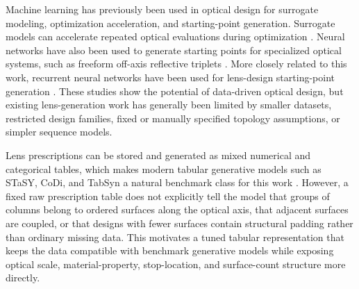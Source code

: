 Machine learning has previously been used in optical design for surrogate modeling, optimization acceleration, and starting-point generation. Surrogate models can accelerate repeated optical evaluations during optimization \cite{hegde2019accelerating}. Neural networks have also been used to generate starting points for specialized optical systems, such as freeform off-axis reflective triplets \cite{Yang:19}. More closely related to this work, recurrent neural networks have been used for lens-design starting-point generation \cite{Cote:21}. These studies show the potential of data-driven optical design, but existing lens-generation work has generally been limited by smaller datasets, restricted design families, fixed or manually specified topology assumptions, or simpler sequence models.

Lens prescriptions can be stored and generated as mixed numerical and categorical tables, which makes modern tabular generative models such as STaSY, CoDi, and TabSyn a natural benchmark class for this work \cite{Kim2023STaSy,Lee2023CoDi,Zhang2024TabSyn}. However, a fixed raw prescription table does not explicitly tell the model that groups of columns belong to ordered surfaces along the optical axis, that adjacent surfaces are coupled, or that designs with fewer surfaces contain structural padding rather than ordinary missing data. This motivates a tuned tabular representation that keeps the data compatible with benchmark generative models while exposing optical scale, material-property, stop-location, and surface-count structure more directly.
